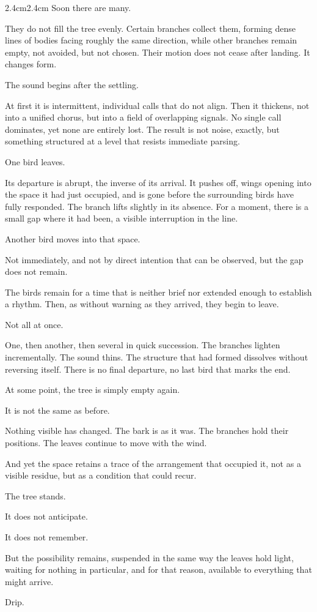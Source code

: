 \begin{adjustwidth}{2.4cm}{2.4cm}
Soon there are many.

They do not fill the tree evenly. Certain branches collect them, forming dense lines
of bodies facing roughly the same direction, while other branches remain empty, not
avoided, but not chosen. Their motion does not cease after landing. It changes form.

The sound begins after the settling.

At first it is intermittent, individual calls that do not align. Then it thickens, not
into a unified chorus, but into a field of overlapping signals. No single call dominates,
yet none are entirely lost. The result is not noise, exactly, but something structured
at a level that resists immediate parsing.

One bird leaves.

Its departure is abrupt, the inverse of its arrival. It pushes off, wings opening into
the space it had just occupied, and is gone before the surrounding birds have fully
responded. The branch lifts slightly in its absence. For a moment, there is a small
gap where it had been, a visible interruption in the line.

Another bird moves into that space.

Not immediately, and not by direct intention that can be observed, but the gap does
not remain.

\vspace{2em}

The birds remain for a time that is neither brief nor extended enough to establish a
rhythm. Then, as without warning as they arrived, they begin to leave.

Not all at once.

One, then another, then several in quick succession. The branches lighten
incrementally. The sound thins. The structure that had formed dissolves without
reversing itself. There is no final departure, no last bird that marks the end.

At some point, the tree is simply empty again.

It is not the same as before.

Nothing visible has changed. The bark is as it was. The branches hold their
positions. The leaves continue to move with the wind.

And yet the space retains a trace of the arrangement that occupied it, not as a
visible residue, but as a condition that could recur.

The tree stands.

It does not anticipate.

It does not remember.

But the possibility remains, suspended in the same way the leaves hold light,
waiting for nothing in particular, and for that reason, available to everything that
might arrive.

\vspace{2em}

\begin{center}
Drip.
\end{center}

\end{adjustwidth}
